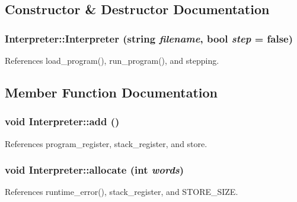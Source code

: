 \subsection{Constructor \& Destructor Documentation}
\hypertarget{classInterpreter_a053aca9ec82a7f02879c5216cad78708}{
\subsubsection[{Interpreter}]{\setlength{\rightskip}{0pt plus 5cm}Interpreter::Interpreter (string {\em filename}, \/  bool {\em step} = {\ttfamily false})}}
\label{classInterpreter_a053aca9ec82a7f02879c5216cad78708}


References load\_\-program(), run\_\-program(), and stepping.



\subsection{Member Function Documentation}
\hypertarget{classInterpreter_aa890b84392084c5cd2c2586dc2a3a7a8}{
\subsubsection[{add}]{\setlength{\rightskip}{0pt plus 5cm}void Interpreter::add ()}}
\label{classInterpreter_aa890b84392084c5cd2c2586dc2a3a7a8}


References program\_\-register, stack\_\-register, and store.

\hypertarget{classInterpreter_ad52aec1a3af5198ba353ddcdc4dacaed}{
\subsubsection[{allocate}]{\setlength{\rightskip}{0pt plus 5cm}void Interpreter::allocate (int {\em words})}}
\label{classInterpreter_ad52aec1a3af5198ba353ddcdc4dacaed}


References runtime\_\-error(), stack\_\-register, and STORE\_\-SIZE.

